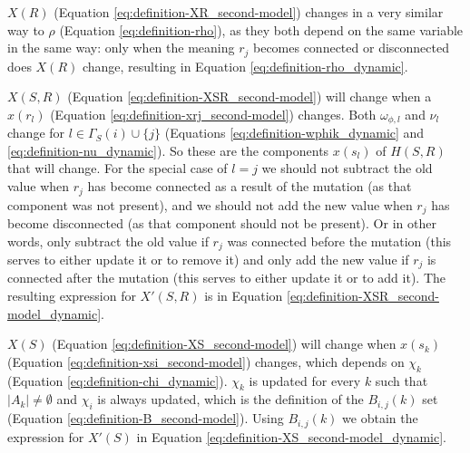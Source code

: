 $X(R)$ (Equation \eqref{eq:definition-XR_second-model}) changes in a very similar way to $\rho$ (Equation \eqref{eq:definition-rho}), as they both depend on the same variable in the same way: only when the meaning $r_j$ becomes connected or disconnected does $X(R)$ change, resulting in Equation \eqref{eq:definition-rho_dynamic}.

$X(S,R)$ (Equation \eqref{eq:definition-XSR_second-model}) will change when a $x(r_l)$ (Equation \eqref{eq:definition-xrj_second-model}) changes.
Both $\omega_{\phi,l}$ and $\nu_l$ change for $l \in \Gamma_S(i) \cup \{j\}$ (Equations \eqref{eq:definition-wphik_dynamic} and \eqref{eq:definition-nu_dynamic}).
So these are the components $x(s_l)$ of $H(S,R)$ that will change.
For the special case of $l=j$ we should not subtract the old value when $r_j$ has become connected as a result of the mutation (as that component was not present), and we should not add the new value when $r_j$ has become disconnected (as that component should not be present).
Or in other words, only subtract the old value if $r_j$ was connected before the mutation (this serves to either update it or to remove it) and only add the new value if $r_j$ is connected after the mutation (this serves to either update it or to add it).
The resulting expression for $X'(S,R)$ is in Equation \eqref{eq:definition-XSR_second-model_dynamic}.

$X(S)$ (Equation \eqref{eq:definition-XS_second-model}) will change when $x(s_k)$ (Equation \eqref{eq:definition-xsi_second-model}) changes, which depends on $\chi_k$ (Equation \eqref{eq:definition-chi_dynamic}).
$\chi_k$ is updated for every $k$ such that $|A_k| \neq \emptyset$ and $\chi_i$ is always updated, which is the definition of the $B_{i,j}(k)$ set (Equation \eqref{eq:definition-B_second-model}).
Using $B_{i,j}(k)$ we obtain the expression for $X'(S)$ in Equation \eqref{eq:definition-XS_second-model_dynamic}.

